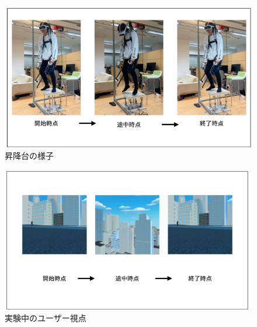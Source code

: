 \begin{figure}[htbp]
  \centering
  \includegraphics[width=1.0\linewidth]{fig/昇降台の様子.png}
  \caption{昇降台の様子}
  \label{fig:chart2}
\end{figure}

\begin{figure}[htbp]
  \centering
  \includegraphics[width=1.0\linewidth]{fig/実験中のユーザー視点.png}
  \caption{実験中のユーザー視点}
  \label{fig:chart3}
\end{figure}




